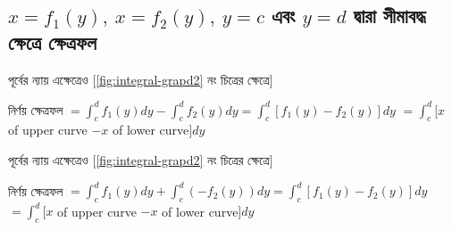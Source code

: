\subsection{ $x=f_1(y),\: x = f_2(y),\: y = c$ এবং $y = d$ দ্বারা সীমাবদ্ধ ক্ষেত্রে ক্ষেত্রফল}

\begin{minipage}{0.45\textwidth}
    
    পূর্বের ন্যায় এক্ষেত্রেও [\ref{fig:integral-grapd2} নং চিত্রের ক্ষেত্রে]

    নির্ণয় ক্ষেত্রফল $= \int_{c}^{d}f_1(y)dy - \int_{c}^{d}f_2(y)dy = \int_{c}^{d}[f_1(y) - f_2(y)]dy$
    $= \int_{c}^{d}[x$ of upper curve $-x$ of lower curve$]dy$

    \centering
    \label{fig:intsegral-grapx}

    

\end{minipage}
\hfill
\begin{minipage}{0.45\textwidth}

    পূর্বের ন্যায় এক্ষেত্রেও [\ref{fig:integral-grapd2} নং চিত্রের ক্ষেত্রে]

    নির্ণয় ক্ষেত্রফল $= \int_{c}^{d}f_1(y)dy + \int_{c}^{d}(-f_2(y))dy = \int_{c}^{d}[f_1(y) - f_2(y)]dy$
    $= \int_{c}^{d}[x$ of upper curve $-x$ of lower curve$]dy$

    \centering
    \label{fig:sintegral-grapd2}
\end{minipage}

